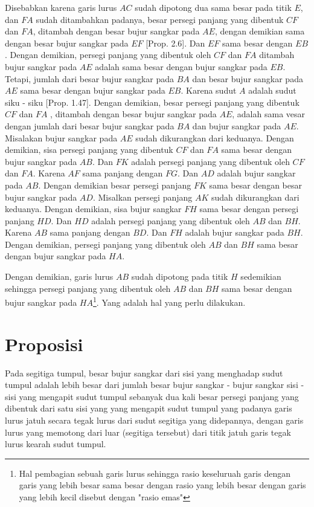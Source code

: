 \documentclass[a4paper]{book}
\begin{document}
Disebabkan karena garis lurus $AC$ sudah dipotong dua sama besar pada titik
$E$, dan $FA$ sudah ditambahkan padanya, besar persegi panjang yang dibentuk
$CF$ dan $FA$, ditambah dengan besar bujur sangkar pada $AE$, dengan demikian
sama dengan besar bujur sangkar pada $EF$ [Prop. 2.6]. Dan $EF$ sama besar 
dengan $EB$. Dengan demikian, persegi panjang yang dibentuk oleh $CF$ dan $FA$
ditambah bujur sangkar pada $AE$ adalah sama besar dengan bujur sangkar pada 
$EB$. Tetapi, jumlah dari besar bujur sangkar pada $BA$ dan besar bujur 
sangkar pada $AE$ sama besar dengan bujur sangkar pada $EB$. Karena sudut $A$
adalah sudut siku - siku [Prop. 1.47]. Dengan demikian, besar persegi panjang
yang dibentuk $CF$ dan $FA$ , ditambah dengan besar bujur sangkar pada $AE$,
adalah sama vesar dengan jumlah dari besar bujur sangkar pada $BA$ dan bujur
sangkar pada $AE$. Misalakan bujur sangkar pada $AE$ sudah dikurangkan dari
keduanya. Dengan demikian, sisa persegi panjang yang dibentuk $CF$ dan $FA$ 
sama besar dengan bujur sangkar pada $AB$. Dan $FK$ adalah persegi panjang 
yang dibentuk oleh $CF$ dan $FA$. Karena $AF$ sama panjang dengan $FG$. Dan
$AD$ adalah bujur sangkar pada $AB$. Dengan demikian besar persegi panjang
$FK$ sama besar dengan besar bujur sangkar pada $AD$. Misalkan persegi 
panjang $AK$ sudah dikurangkan dari keduanya. Dengan demikian, sisa bujur
sangkar $FH$ sama besar dengan persegi panjang $HD$. Dan $HD$ adalah persegi
panjang yang dibentuk oleh $AB$ dan $BH$. Karena $AB$ sama panjang dengan $BD$.
Dan $FH$ adalah bujur sangkar pada $BH$. Dengan demikian, persegi panjang yang
dibentuk oleh $AB$ dan $BH$ sama besar dengan bujur sangkar pada $HA$.

Dengan demikian, garis lurus $AB$ sudah dipotong pada titik  $H$ sedemikian
sehingga persegi panjang yang dibentuk oleh $AB$ dan $BH$ sama besar dengan
bujur sangkar pada $HA$\footnote{Hal pembagian sebuah garis lurus sehingga 
rasio keseluruah garis dengan garis yang lebih besar sama besar 
dengan rasio yang lebih besar dengan garis yang lebih kecil disebut 
dengan "rasio emas"}.
Yang adalah hal yang perlu dilakukan.  

\section*{\centering Proposisi \thesection} 

Pada segitiga tumpul, besar bujur sangkar dari sisi yang menghadap sudut tumpul
 adalah lebih besar dari jumlah besar bujur sangkar - bujur sangkar sisi - sisi 
yang mengapit sudut tumpul sebanyak dua kali besar persegi panjang yang 
dibentuk dari satu sisi yang yang mengapit sudut tumpul yang padanya garis lurus 
jatuh secara tegak lurus dari sudut segitiga yang didepannya, dengan garis lurus yang memotong dari luar 
(segitiga tersebut) dari titik jatuh garis tegak lurus kearah sudut tumpul.
\end{document}
